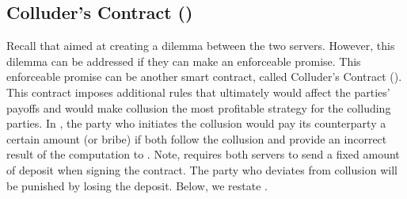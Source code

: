 




\subsection{Colluder's Contract (\SCcc)}

Recall that \SCpc aimed at creating a dilemma between the two servers. However, this dilemma can be addressed if they can make an  enforceable promise.  This enforceable promise can be another smart contract, called Colluder's Contract (\SCcc).  This contract imposes additional rules that ultimately would affect the parties’ payoffs and would make collusion the most profitable strategy for the colluding parties. In \SCcc, the party who initiates the collusion would pay its counterparty a certain amount (or bribe) if both follow the collusion and provide an incorrect result of the computation to \SCpc.  Note, \SCcc requires both servers to send a fixed amount of deposit when signing the contract.  The party who deviates from collusion will be punished by losing the deposit. Below, we restate \SCcc. 


